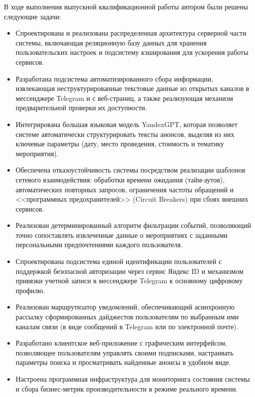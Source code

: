 В ходе выполнения выпускной квалификационной работы автором были решены следующие задачи:
\begin{itemize}

    \item Спроектирована и реализована распределенная архитектура серверной части системы, включающая реляционную базу данных для хранения пользовательских настроек и подсистему кэширования для ускорения работы сервисов.

    \item Разработана подсистема автоматизированного сбора информации, извлекающая неструктурированные текстовые данные из открытых каналов в мессенджере Telegram и с веб-страниц, а также реализующая механизм предварительной проверки их доступности.

    \item Интегрирована большая языковая модель YandexGPT, которая позволяет системе автоматически структурировать тексты анонсов, выделяя из них ключевые параметры (дату, место проведения, стоимость и тематику мероприятия).

    \item Обеспечена отказоустойчивость системы посредством реализации шаблонов сетевого взаимодействия: обработки времени ожидания (тайм-аутов), автоматических повторных запросов, ограничения частоты обращений и <<программных предохранителей>> (Circuit Breakers) при сбоях внешних сервисов.

    \item Реализован детерминированный алгоритм фильтрации событий, позволяющий точно сопоставлять извлеченные данные о мероприятиях с заданными персональными предпочтениями каждого пользователя.

    \item Спроектирована подсистема единой идентификации пользователей с поддержкой безопасной авторизации через сервис Яндекс ID и механизмом привязки учетной записи в мессенджере Telegram к основному цифровому профилю.

    \item Реализован маршрутизатор уведомлений, обеспечивающий асинхронную рассылку сформированных дайджестов пользователям по выбранным ими каналам связи (в виде сообщений в Telegram или по электронной почте).

    \item Разработано клиентское веб-приложение с графическим интерфейсом, позволяющее пользователям управлять своими подписками, настраивать параметры поиска и просматривать найденные анонсы в удобном виде.

    \item Настроена программная инфраструктура для мониторинга состояния системы и сбора бизнес-метрик производительности в режиме реального времени.

\end{itemize}

